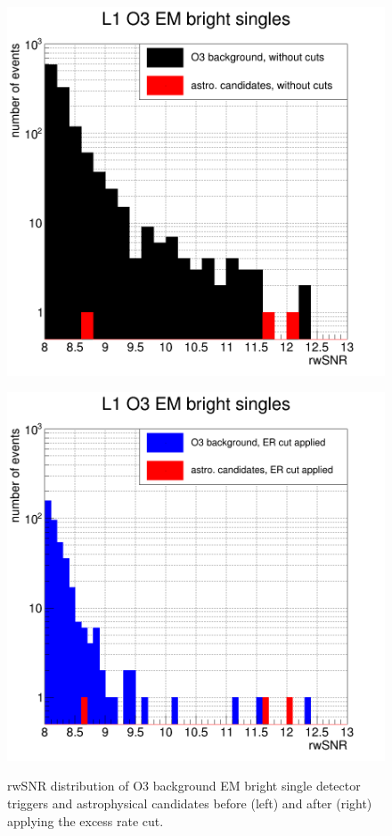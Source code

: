 \begin{figure}[hb]
  \centering
  \begin{minipage}{0.45\linewidth}
    \centering
    \includegraphics[width=\linewidth]{sectionSelection/plotsEMbright/cL1_O3_beforeCut.png}
    \label{fig:embright_astro_beforecut}
  \end{minipage}
  \hfill
  \begin{minipage}{0.45\linewidth}
    \centering
    \includegraphics[width=\linewidth]{sectionSelection/plotsEMbright/cL1_O3_afterCutER.png}
    \label{fig:embright_astro_aftercut}
  \end{minipage}
  \hfill
  \caption{rwSNR distribution of O3 background EM bright single detector triggers and astrophysical candidates before (left) and after (right) applying the excess rate cut.}
  \label{fig:embright_astro_ercut}
\end{figure}


